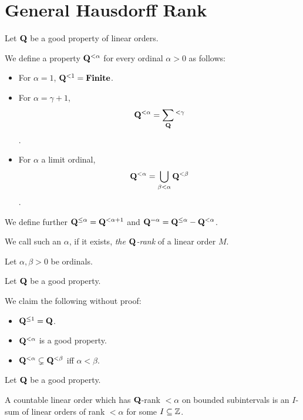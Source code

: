 
\section{General Hausdorff Rank}

\begin{definition}
  Let $\mathbf{Q}$ be a good property of linear orders.

  We define a property $\mathbf{Q}^{< \alpha}$
  for every ordinal $\alpha > 0$ as follows:

  \begin{itemize}
    \item For $\alpha = 1$, $\mathbf{Q}^{< 1} = \mathbf{Finite}$.
    \item For $\alpha = \gamma + 1$,
          $$\mathbf{Q}^{< \alpha} = \sum_{\mathbf{Q}}{^{< \gamma}}$$.
    \item For $\alpha$ a limit ordinal,
          $$\mathbf{Q}^{< \alpha} = \bigcup_{\beta < \alpha} \mathbf{Q}^{< \beta}$$.
  \end{itemize}

  We define further $\mathbf{Q}^{\le \alpha} = \mathbf{Q}^{< \alpha + 1}$
  and $\mathbf{Q}^{= \alpha} = \mathbf{Q}^{\le \alpha} - \mathbf{Q}^{< \alpha}$.
  
  We call such an $\alpha$, if it exists,
  \emph{the $\mathbf{Q}$-rank} of a linear order $M$.
\end{definition}

\begin{observations}
  Let $\alpha, \beta > 0$ be ordinals.

  Let $\mathbf{Q}$ be a good property.

  We claim the following without proof:

  \begin{itemize}
    \item $\mathbf{Q}^{\le 1} = \mathbf{Q}$.
    \item $\mathbf{Q}^{< \alpha}$ is a good property.
    \item $\mathbf{Q}^{< \alpha} \subsetneq \mathbf{Q}^{< \beta}$ iff $\alpha < \beta$.
  \end{itemize}
\end{observations}

\begin{lemma}
  Let $\mathbf{Q}$ be a good property.

  A countable linear order which has $\mathbf{Q}$-rank $< \alpha$
  on bounded subintervals is an $I$-sum of 
  linear orders of rank $< \alpha$ for some $I \subseteq \mathbb{Z}$.
\end{lemma}

